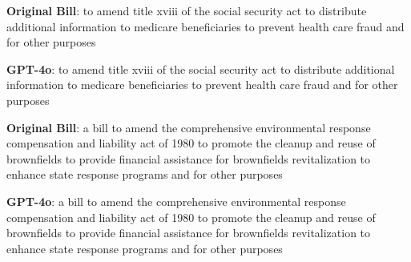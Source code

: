 \begin{tcolorbox}[colback=white,colframe=black!75!white] 
    \begin{minipage}{0.475\textwidth}
    \centering
    \begin{tcolorbox}[colback=black!5!white,colframe=black!75!white, fontupper=\small, fontlower=\small] 
    \textbf{Original Bill}: to amend title xviii of the social security act to distribute additional information to medicare beneficiaries to prevent health care fraud and for other purposes
    \end{tcolorbox}
    \end{minipage} 
    \hfill
    \begin{minipage}{0.475\textwidth}
    \centering
    \begin{tcolorbox}[colback=black!5!white,colframe=black!75!white, fontupper=\small, fontlower=\small] 
    \textbf{GPT-4o}: to amend title xviii of the social security act to distribute additional information to medicare beneficiaries to prevent health care fraud and for other purposes
    \end{tcolorbox}
    \end{minipage}
\end{tcolorbox}
\begin{tcolorbox}[colback=white,colframe=black!75!white] 
    \begin{minipage}{0.475\textwidth}
    \centering
    \begin{tcolorbox}[colback=black!5!white,colframe=black!75!white, fontupper=\small, fontlower=\small] 
    \textbf{Original Bill}: a bill to amend the comprehensive environmental response compensation and liability act of 1980 to promote the cleanup and reuse of brownfields to provide financial assistance for brownfields revitalization to enhance state response programs and for other purposes
    \end{tcolorbox}
    \end{minipage} 
    \hfill
    \begin{minipage}{0.475\textwidth}
    \centering
    \begin{tcolorbox}[colback=black!5!white,colframe=black!75!white, fontupper=\small, fontlower=\small] 
    \textbf{GPT-4o}: a bill to amend the comprehensive environmental response compensation and liability act of 1980 to promote the cleanup and reuse of brownfields to provide financial assistance for brownfields revitalization to enhance state response programs and for other purposes
    \end{tcolorbox}
    \end{minipage}
\end{tcolorbox}